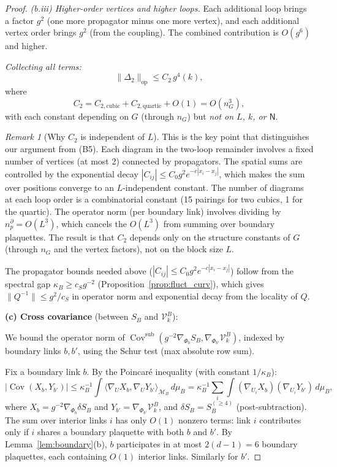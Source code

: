 \documentclass[11pt,a4paper]{article}
\theoremstyle{plain}
\theoremstyle{definition}
\theoremstyle{remark}
\newtheorem{remark}[theorem]{Remark}
\newcommand{\Cov}{\operatorname{Cov}}
\newcommand{\cM}{\mathcal{M}}
\newcommand{\cV}{\mathcal{V}}
\begin{document}
\begin{proof}
\textit{(b.iii) Higher-order vertices and higher loops.}
Each additional loop brings a factor $g^2$ (one more
propagator minus one more vertex), and each additional
vertex order brings $g^2$ (from the coupling). The
combined contribution is $O(g^6)$ and higher.

\emph{Collecting all terms:}
\begin{equation}\label{eq:Delta2_bound}
  \|\Delta_2\|_{\mathrm{op}} \le C_2\,g^4(k),
\end{equation}
where
\begin{equation}\label{eq:C2_explicit}
  C_2 = C_{2,\mathrm{cubic}} + C_{2,\mathrm{quartic}}
  + O(1) = O(n_G^3),
\end{equation}
with each constant depending on $G$ (through $n_G$)
but \emph{not on $L$, $k$, or $\mathsf{N}$}.

\begin{remark}[Why $C_2$ is independent of $L$]
\label{rem:C2_L}
This is the key point that distinguishes our
argument from (B5). Each diagram in the two-loop
remainder involves a fixed number of vertices
(at most 2) connected by propagators. The spatial
sums are controlled by the exponential decay
$|C_{ij}| \le C_0 g^2 e^{-c|x_i - x_j|}$, which
makes the sum over positions converge to an
$L$-independent constant. The number of diagrams at
each loop order is a combinatorial constant (15
pairings for two cubics, 1 for the quartic).
The operator norm (per boundary link) involves
dividing by $n_p^\partial = O(L^3)$, which cancels
the $O(L^3)$ from summing over boundary plaquettes.
The result is that $C_2$ depends only on the structure
constants of $G$ (through $n_G$ and the vertex factors),
not on the block size $L$.
\end{remark}

The propagator bounds needed above ($|C_{ij}| \le C_0 g^2
e^{-c|x_i-x_j|}$) follow from the spectral gap
$\kappa_B \ge c_S g^{-2}$ (Proposition~\ref{prop:fluct_curv}),
which gives $\|Q^{-1}\| \le g^2/c_S$ in operator norm
and exponential decay from the locality of $Q$.

\medskip\noindent
\textbf{(c) Cross covariance} (between $S_B$ and $\cV_k^B$):

We bound the operator norm of
$\Cov^{\mathrm{sub}}(g^{-2}\nabla_{\Phi_b} S_B,
\nabla_{\Phi_{b'}}\cV_k^B)$, indexed by boundary links
$b, b'$, using the Schur test (max absolute row sum).

Fix a boundary link $b$. By the Poincar\'e inequality
(with constant $1/\kappa_B$):
\begin{equation}
  |\Cov(X_b, Y_{b'})| \le \kappa_B^{-1}
  \int \langle \nabla_U X_b, \nabla_U Y_{b'} \rangle_{\cM_B}
  \,d\mu_B
  = \kappa_B^{-1} \sum_i \int
  (\nabla_{U_i} X_b)(\nabla_{U_i} Y_{b'})\,d\mu_B,
\end{equation}
where $X_b = g^{-2}\nabla_{\Phi_b}\delta S_B$ and
$Y_{b'} = \nabla_{\Phi_{b'}}\cV_k^B$, and
$\delta S_B = S_B^{(\ge 4)}$ (post-subtraction).
The sum over interior links $i$ has only $O(1)$ nonzero
terms: link $i$ contributes only if $i$ shares a boundary
plaquette with both $b$ and $b'$. By
Lemma~\ref{lem:boundary}(b), $b$ participates in at most
$2(d-1) = 6$ boundary plaquettes, each containing $O(1)$
interior links. Similarly for $b'$.


\end{proof}
\end{document}
